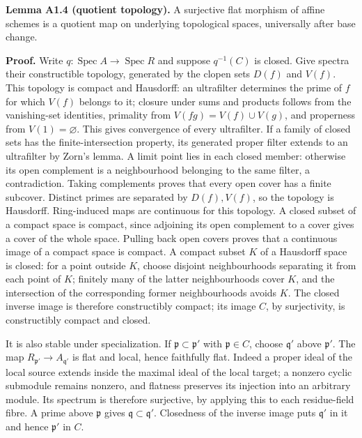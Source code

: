 \documentclass[11pt,a4paper,openany]{report}
\begin{document}
\textbf{Lemma A1.4 (quotient topology).} A surjective flat morphism of affine schemes is a quotient map on underlying topological spaces, universally after base change.

\textbf{Proof.} Write \(q:\operatorname{Spec}A\to\operatorname{Spec}R\) and suppose \(q^{-1}(C)\) is closed. Give spectra their constructible topology, generated by the clopen sets \(D(f)\) and \(V(f)\). This topology is compact and Hausdorff: an ultrafilter determines the prime of \(f\) for which \(V(f)\) belongs to it; closure under sums and products follows from the vanishing-set identities, primality from \(V(fg)=V(f)\cup V(g)\), and properness from \(V(1)=\varnothing\). This gives convergence of every ultrafilter. If a family of closed sets has the finite-intersection property, its generated proper filter extends to an ultrafilter by Zorn's lemma. A limit point lies in each closed member: otherwise its open complement is a neighbourhood belonging to the same filter, a contradiction. Taking complements proves that every open cover has a finite subcover. Distinct primes are separated by \(D(f),V(f)\), so the topology is Hausdorff. Ring-induced maps are continuous for this topology. A closed subset of a compact space is compact, since adjoining its open complement to a cover gives a cover of the whole space. Pulling back open covers proves that a continuous image of a compact space is compact. A compact subset \(K\) of a Hausdorff space is closed: for a point outside \(K\), choose disjoint neighbourhoods separating it from each point of \(K\); finitely many of the latter neighbourhoods cover \(K\), and the intersection of the corresponding former neighbourhoods avoids \(K\). The closed inverse image is therefore constructibly compact; its image \(C\), by surjectivity, is constructibly compact and closed.

It is also stable under specialization. If \(\mathfrak p\subset\mathfrak p'\) with \(\mathfrak p\in C\), choose \(\mathfrak q'\) above \(\mathfrak p'\). The map \(R_{\mathfrak p'}\to A_{\mathfrak q'}\) is flat and local, hence faithfully flat. Indeed a proper ideal of the local source extends inside the maximal ideal of the local target; a nonzero cyclic submodule remains nonzero, and flatness preserves its injection into an arbitrary module. Its spectrum is therefore surjective, by applying this to each residue-field fibre. A prime above \(\mathfrak p\) gives \(\mathfrak q\subset\mathfrak q'\). Closedness of the inverse image puts \(\mathfrak q'\) in it and hence \(\mathfrak p'\) in \(C\).
\end{document}
